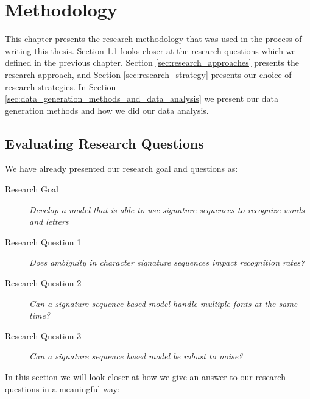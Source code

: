 
\chapter{Methodology}
\label{ch:methodology}
This chapter presents the research methodology that was used in the process of writing this thesis. Section \ref{sec:research_questions_and_approach} looks closer at the research questions which we defined in the previous chapter. Section \ref{sec:research_approaches} presents the research approach, and Section \ref{sec:research_strategy} presents our choice of research strategies. In Section \ref{sec:data_generation_methods_and_data_analysis} we present our data generation methods and how we did our data analysis.


\section{Evaluating Research Questions}
\label{sec:research_questions_and_approach}
We have already presented our research goal and questions as:

\begin{description}
    \item[Research Goal]{\textit{Develop a model that is able to use signature sequences to recognize words and letters}}
    \item[Research Question 1]{\textit{Does ambiguity in character signature sequences impact recognition rates?}}
    \item[Research Question 2]{\textit{Can a signature sequence based model handle multiple fonts at the same time?}}
    \item[Research Question 3]{\textit{Can a signature sequence based model be robust to noise?}}
\end{description}

In this section we will look closer at how we give an answer to our research questions in a meaningful way:

